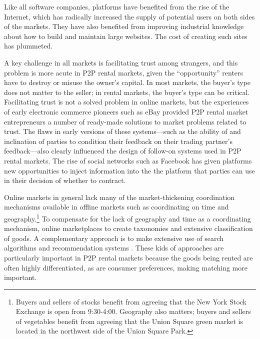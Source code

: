 \documentclass[11pt]{article}
\begin{document}
Like all software companies, platforms have benefited from the rise of the Internet, which has radically increased the supply of potential users on both sides of the markets. 
They have also benefited from improving industrial knowledge about how to build and maintain large websites.
The cost of creating such sites has plummeted. 

A key challenge in all markets is facilitating trust among strangers, and this problem is more acute in P2P rental markets, given the ``opportunity'' renters have to destroy or misuse the owner's capital.
In most markets, the buyer's type does not matter to the seller; in rental markets, the buyer's type can be critical. 
Facilitating trust is not a solved problem in online markets, but the experiences of early electronic commerce pioneers such as eBay provided P2P rental market entrepreneurs a number of ready-made solutions to market problems related to trust. 
The flaws in early versions of these systems---such as the ability of and inclination of parties to condition their feedback on their trading partner's feedback---also clearly influenced the design of follow-on systems used in P2P rental markets. 
The rise of social networks such as Facebook has given platforms new opportunities to inject information into the the platform that parties can use in their decision of whether to contract. 

Online markets in general lack many of the market-thickening coordination mechanisms available in offline markets such as coordinating on time and geography.\footnote{
  Buyers and sellers of stocks benefit from agreeing that the New York Stock Exchange is open from 9:30-4:00.
  Geography also matters; buyers and sellers of vegetables benefit from agreeing that the Union Square green market is located in the northwest side of the Union Square Park.
}
To compensate for the lack of geography and time as a coordinating mechanism, online marketplaces to create taxonomies and extensive classification of goods.
A complementary approach is to make extensive use of search algorithms and recommendation systems \citep{resnick1997recommender, adomavicius2005toward}.
These kids of approaches are particularly important in P2P rental markets because the goods being rented are often highly differentiated, as are consumer preferences, making matching more important. 
\end{document}
